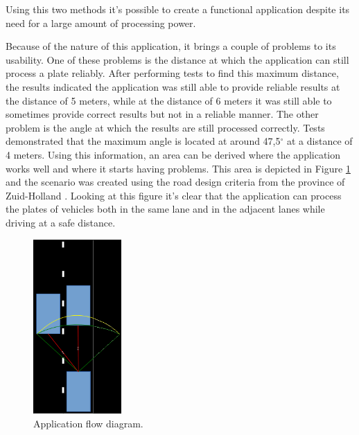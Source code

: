 Using this two methods it's possible to create a functional application despite its need for a large amount of processing power.



Because of the nature of this application, it brings a couple of problems to its usability. One of these problems is the distance at which the application can still process a plate reliably. After performing tests to find this maximum distance, the results indicated the application was still able to provide reliable results at the distance of 5 meters, while at the distance of 6 meters it was still able to sometimes provide correct results but not in a reliable manner. The other problem is the angle at which the results are still processed correctly. Tests demonstrated that the maximum angle is located at around 47,5$^{\circ}$ at a distance of 4 meters. Using this information, an area can be derived where the application works well and where it starts having problems. This area is depicted in Figure \ref{fig:road-situation} and the scenario was created using the road design criteria from the province of Zuid-Holland \cite{road-design}. Looking at this figure it's clear that the application can process the plates of vehicles both in the same lane and in the adjacent lanes while driving at a safe distance.

\begin{figure}[ht]
    \centering
    \includegraphics[width=0.3\textwidth]{plaatjes/roadeye-road}
    \caption{Application flow diagram.}
    \label{fig:road-situation}
\end{figure}%




